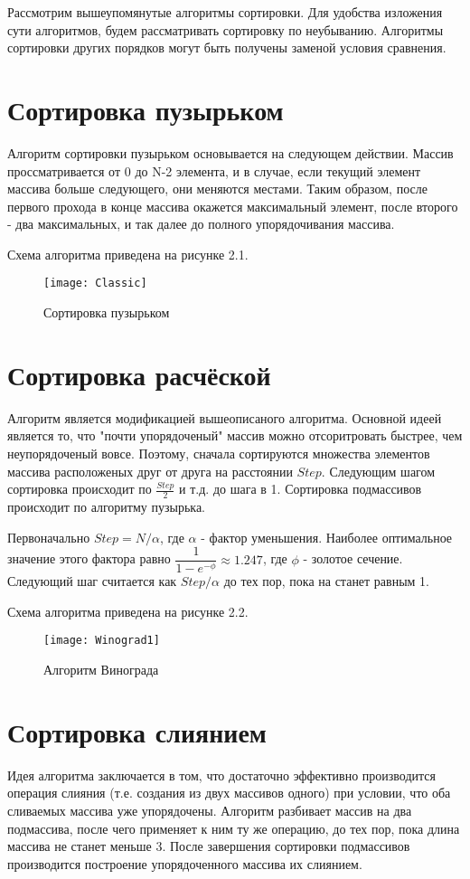 Рассмотрим вышеупомянутые алгоритмы сортировки. Для удобства изложения сути алгоритмов, будем рассматривать сортировку по неубыванию. Алгоритмы сортировки других порядков могут быть получены заменой условия сравнения.

\section{Сортировка пузырьком}
Алгоритм сортировки пузырьком основывается на следующем действии. Массив проссматривается от 0 до N-2 элемента, и в случае, если текущий элемент массива больше следующего, они меняются местами. Таким образом, после первого прохода в конце массива окажется максимальный элемент, после второго - два максимальных, и так далее до полного упорядочивания массива.

Схема алгоритма приведена на рисунке 2.1.
\begin{figure}[h]
	\begin{center}
		{\texttt{[image: Classic]}}
		\caption{Сортировка пузырьком}
	\end{center}
\end{figure}


\section{Сортировка расчёской}
Алгоритм является модификацией вышеописаного алгоритма. Основной идеей является то, что "почти упорядоченый" массив можно отсоритровать быстрее, чем неупорядоченый вовсе. Поэтому, сначала сортируются множества элементов массива расположеных друг от друга на расстоянии $ Step $. Следующим шагом сортировка происходит по $ \frac{Step}{2} $ и т.д. до шага в 1. Сортировка подмассивов происходит по алгоритму пузырька.

Первоначально $Step = N/\alpha$, где $\alpha$ - фактор уменьшения. Наиболее оптимальное значение этого фактора равно $\dfrac{1}{1-e^{-\phi}} \approx 1.247$, где $\phi$ - золотое сечение. Следующий шаг считается как $Step/\alpha$ до тех пор, пока на станет равным 1.

Схема алгоритма приведена на рисунке 2.2.
\begin{figure}[h]
	\begin{center}
		{\texttt{[image: Winograd1]}}
		\caption{Алгоритм Винограда}
	\end{center}
\end{figure}


\section{Сортировка слиянием}
Идея алгоритма заключается в том, что достаточно эффективно производится операция слияния (т.е. создания из двух массивов одного) при условии, что оба сливаемых массива уже упорядочены. Алгоритм разбивает массив на два подмассива, после чего применяет к ним ту же операцию, до тех пор, пока длина массива не станет меньше 3. После завершения сортировки подмассивов производится построение упорядоченного массива их слиянием.

